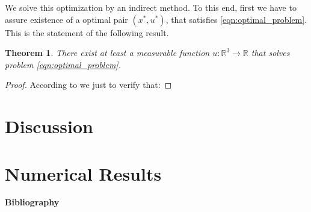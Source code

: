 \documentclass[preprint, 12pt]{elsarticle}
\newtheorem{theorem}{Theorem}
\begin{document}
        We solve this optimization by an indirect method. To this end, first we
    have to assure existence of a optimal pair $(x^*, u^*)$,
    that satisfies \cref{eqn:optimal_problem}. This is the statement of
    the following result.

    \begin{theorem}
        There exist at least a measurable function
        $u: \mathbb{R} ^ 3 \to \mathbb{R}$ that solves problem
        \eqref{eqn:optimal_problem}.
    \end{theorem}
   \begin{proof}
        According to \cite{} we just to verify that:

   \end{proof}

\section{Discussion}

\section{Numerical Results}

    

\textbf{Bibliography}


\end{document}
